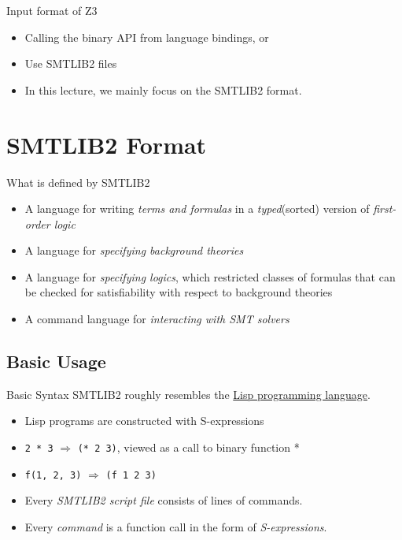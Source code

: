 \documentclass[10pt]{beamer}
\begin{document}
\begin{frame}{Input format of Z3}
  \begin{itemize}[<+->]
    \item Calling the binary API from language bindings, or
    \item Use SMTLIB2 files
    \item In this lecture, we mainly focus on the SMTLIB2 format.
  \end{itemize}

\end{frame}

\section{SMTLIB2 Format}

\begin{frame}{What is defined by SMTLIB2}
  \begin{itemize}[<+->]
    \item A language for writing \emph{terms and formulas} in a \emph{typed}(sorted) version of \emph{first-order logic}
    \item A language for \emph{specifying background theories}
    \item A language for \emph{specifying logics}, which restricted classes of formulas that can be checked for satisfiability with respect to background theories
    \item A command language for \emph{interacting with SMT solvers}
  \end{itemize}
\end{frame}

\subsection{Basic Usage}

\begin{frame}{Basic Syntax}
  SMTLIB2\cite{BarFT-RR-17} roughly resembles the \href{https://en.wikipedia.org/wiki/Lisp_(programming_language)}{Lisp programming language}.
  \begin{itemize}[<+->]
    \item Lisp programs are constructed with \alert{S-expressions}
    \item \texttt{2 * 3} $\Rightarrow$ \texttt{(* 2 3)}, viewed as a call to binary function *
    \item \texttt{f(1, 2, 3)} $\Rightarrow$ \texttt{(f 1 2 3)}
  \end{itemize}

  \begin{itemize}[<+->]
    \item Every \emph{SMTLIB2 script file} consists of \alert{lines of commands}.
    \item Every \emph{command} is a \alert{function call} in the form of \emph{S-expressions}.
  \end{itemize}
\end{frame}
\end{document}

